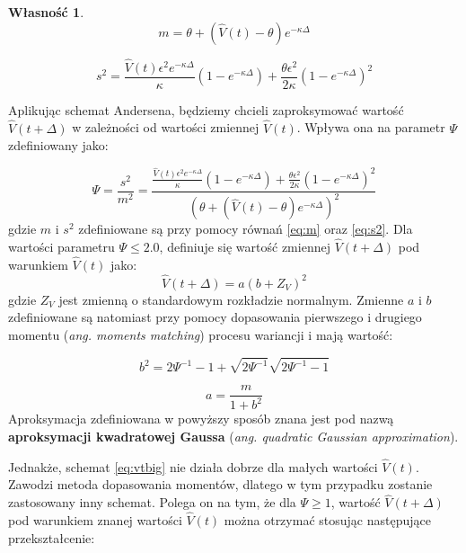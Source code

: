 \documentclass{pracamgr}
\newtheorem{prop}{Własność}
\begin{document}
{\begin{prop}
\begin{equation}
  \label{eq:m}
  m= \theta + (\hat{V}(t) - \theta) e^{-\kappa \Delta}
\end{equation}

\begin{equation}
  \label{eq:s2}
  s^2 = \frac{\hat{V}(t)\epsilon^2 e^{-\kappa \Delta}}{\kappa} (1 - e^{-\kappa \Delta}) + \frac{\theta \epsilon^2}{2 \kappa}(1 - e^{-\kappa \Delta})^2
\end{equation}
\end{prop}
 

Aplikując schemat Andersena, będziemy chcieli zaproksymować wartość  $\hat{V}(t + \Delta)$ w zależności od wartości zmiennej $\hat{V}(t)$. Wpływa ona na parametr $\Psi$ zdefiniowany jako:



\begin{equation}
 \label{eq:ksi}
 \Psi = \frac{s^2}{m^2} = \frac{\frac{\hat{V}(t)\epsilon^2 e^{-\kappa \Delta}}{\kappa} (1 - e^{-\kappa \Delta}) + \frac{\theta \epsilon^2}{2 \kappa}(1 - e^{-\kappa \Delta})^2}{(\theta + (\hat{V}(t) - \theta) e^{-\kappa \Delta})^2} 
\end{equation}
gdzie $m$ i $s^2$ zdefiniowane są przy pomocy równań \ref{eq:m} oraz \ref{eq:s2}.
Dla wartości parametru $\Psi \leq 2.0$, definiuje się wartość zmiennej  $\hat{V}(t + \Delta)$  pod warunkiem  $\hat{V}(t)$ jako:
\begin{equation}
 \label{eq:vtbig}
\hat{V}(t + \Delta)  = a (b + Z_V)^2
\end{equation}
gdzie $Z_V$ jest zmienną o standardowym rozkładzie normalnym. Zmienne $a$ i $b$ zdefiniowane są natomiast przy pomocy dopasowania pierwszego i drugiego momentu (\textit{ang. moments matching}) procesu wariancji i mają wartość:


\begin{equation}
\label{eq:b}
b^2 = 2 \Psi^{-1} - 1 + \sqrt{2 \Psi^{-1}} \sqrt{2 \Psi^{-1} - 1}
\end{equation}

\begin{equation}
\label{eq:a}
a = \frac{m}{1 + b^2}
\end{equation}
Aproksymacja zdefiniowana w powyższy sposób znana jest pod nazwą \textbf{aproksymacji kwadratowej Gaussa} (\textit{ang. quadratic Gaussian approximation}).


Jednakże, schemat \ref{eq:vtbig} nie działa dobrze dla małych wartości $\hat{V}(t)$. Zawodzi metoda dopasowania momentów, dlatego w tym przypadku 
zostanie zastosowany inny schemat. Polega on na tym, że dla $\Psi \geq 1$, wartość $\hat{V}(t + \Delta)$ pod warunkiem znanej wartości $\hat{V}(t)$ można otrzymać stosując następujące przekształcenie:

}
\end{document}
